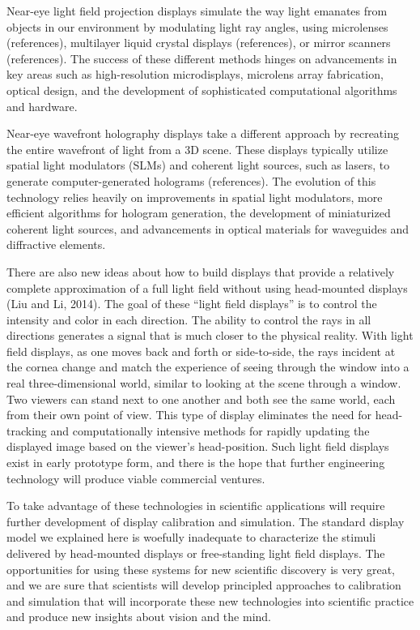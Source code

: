 \documentclass[
  letterpaper,
]{book}
\begin{document}
Near-eye light field projection displays simulate the way light emanates
from objects in our environment by modulating light ray angles, using
microlenses (references), multilayer liquid crystal displays
(references), or mirror scanners (references). The success of these
different methods hinges on advancements in key areas such as
high-resolution microdisplays, microlens array fabrication, optical
design, and the development of sophisticated computational algorithms
and hardware.

Near-eye wavefront holography displays take a different approach by
recreating the entire wavefront of light from a 3D scene. These displays
typically utilize spatial light modulators (SLMs) and coherent light
sources, such as lasers, to generate computer-generated holograms
(references). The evolution of this technology relies heavily on
improvements in spatial light modulators, more efficient algorithms for
hologram generation, the development of miniaturized coherent light
sources, and advancements in optical materials for waveguides and
diffractive elements.

There are also new ideas about how to build displays that provide a
relatively complete approximation of a full light field without using
head-mounted displays (Liu and Li, 2014). The goal of these ``light
field displays'' is to control the intensity and color in each
direction. The ability to control the rays in all directions generates a
signal that is much closer to the physical reality. With light field
displays, as one moves back and forth or side-to-side, the rays incident
at the cornea change and match the experience of seeing through the
window into a real three-dimensional world, similar to looking at the
scene through a window. Two viewers can stand next to one another and
both see the same world, each from their own point of view. This type of
display eliminates the need for head-tracking and computationally
intensive methods for rapidly updating the displayed image based on the
viewer's head-position. Such light field displays exist in early
prototype form, and there is the hope that further engineering
technology will produce viable commercial ventures.

To take advantage of these technologies in scientific applications will
require further development of display calibration and simulation. The
standard display model we explained here is woefully inadequate to
characterize the stimuli delivered by head-mounted displays or
free-standing light field displays. The opportunities for using these
systems for new scientific discovery is very great, and we are sure that
scientists will develop principled approaches to calibration and
simulation that will incorporate these new technologies into scientific
practice and produce new insights about vision and the mind.
\end{document}
